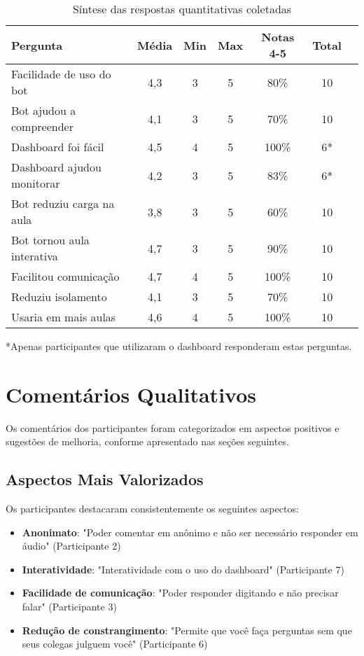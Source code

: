 \begin{table}[htb]
\centering
\caption{Síntese das respostas quantitativas coletadas}
\label{tab:respostas-completas}
\footnotesize
\begin{tabular}{|l|c|c|c|c|c|c|}
\hline
\textbf{Pergunta} & \textbf{Média} & \textbf{Min} & \textbf{Max} & \textbf{Notas 4-5} & \textbf{Total} \\
\hline
Facilidade de uso do bot & 4,3 & 3 & 5 & 80\% & 10 \\
\hline
Bot ajudou a compreender & 4,1 & 3 & 5 & 70\% & 10 \\
\hline
Dashboard foi fácil & 4,5 & 4 & 5 & 100\% & 6* \\
\hline
Dashboard ajudou monitorar & 4,2 & 3 & 5 & 83\% & 6* \\
\hline
Bot reduziu carga na aula & 3,8 & 3 & 5 & 60\% & 10 \\
\hline
Bot tornou aula interativa & 4,7 & 3 & 5 & 90\% & 10 \\
\hline
Facilitou comunicação & 4,7 & 4 & 5 & 100\% & 10 \\
\hline
Reduziu isolamento & 4,1 & 3 & 5 & 70\% & 10 \\
\hline
Usaria em mais aulas & 4,6 & 4 & 5 & 100\% & 10 \\
\hline
\end{tabular}
\begin{flushleft}
\footnotesize
*Apenas participantes que utilizaram o dashboard responderam estas perguntas.
\end{flushleft}
\end{table}

\section{Comentários Qualitativos}
\label{sec:comentarios-qualitativos}

Os comentários dos participantes foram categorizados em aspectos positivos e
sugestões de melhoria, conforme apresentado nas seções seguintes.

\subsection{Aspectos Mais Valorizados}
\label{subsec:aspectos-positivos}

Os participantes destacaram consistentemente os seguintes aspectos:

\begin{itemize}
\item \textbf{Anonimato}: "Poder comentar em anônimo e não ser necessário
responder em áudio" (Participante 2)
\item \textbf{Interatividade}: "Interatividade com o uso do dashboard"
(Participante 7)
\item \textbf{Facilidade de comunicação}: "Poder responder digitando e não
precisar falar" (Participante 3)
\item \textbf{Redução de constrangimento}: "Permite que você faça perguntas sem
que seus colegas julguem você" (Participante 6)
\end{itemize}

